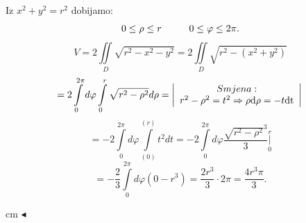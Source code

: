 \documentclass[a4paper,11pt]{article}
\begin{document}
 Iz $x^2 + y^2 = r^2$ dobijamo:
 $$0\leq \rho\leq r \hspace{1 cm} 0\leq \varphi\leq 2\pi.$$
 $$V = 2\iint \limits_D \sqrt{r^{2} - x^2 - y^2 } = 2\iint \limits_D \sqrt{r^{2} - (x^2 + y^2) }$$
  $$ = 2 \int\limits_{0}^{2\pi } d\varphi \int\limits_{0}^{r}\sqrt{r^{2}  - \rho^{2}} d\rho =\left|
\begin{array}{ccc}
Smjena: \\
 r^2 - \rho^{2} = t^{2}  \Rightarrow \rho\mathrm{d\rho}= -t \mathrm{dt} \\
  \end{array}\right |\\$$
  $$ = -2\int\limits_{0}^{2\pi } d\varphi \int\limits_{(0)}^{(r)} t^{2}   dt = -2\int\limits_{0}^{2\pi } d\varphi  \frac{\sqrt{r^{2}  - \rho^{2}}^{3}}{3}\underset{0}{\overset{r}{ \bigg\vert}} $$
  $$= -\frac{2}{3}\int\limits_{0}^{2\pi } d\varphi ( 0 -r^{3}) = \frac{2r^{3}}{3}\cdot 2\pi = \frac{4r^{3}\pi}{3}. $$
 
 cm $\blacktriangleleft$ \\
\end{document}
